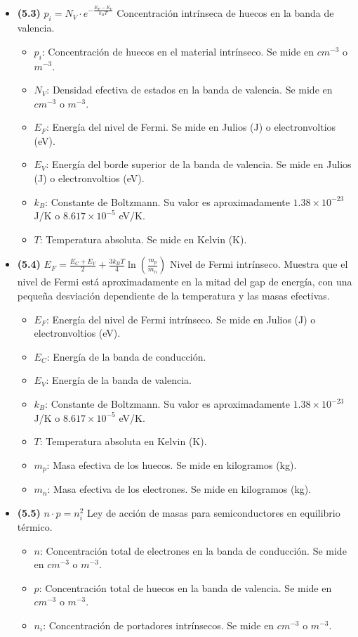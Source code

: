\documentclass{article}
\begin{document}
\begin{itemize}
				\item \textbf{(5.3)} $\boxed{p_i = N_V \cdot e^{-\frac{E_F - E_V}{k_B T}}}$ Concentración intrínseca de huecos en la banda de valencia.
					\begin{itemize}
						\item $p_i$: Concentración de huecos en el material intrínseco. Se mide en $cm^{-3}$ o $m^{-3}$.
						\item $N_V$: Densidad efectiva de estados en la banda de valencia. Se mide en $cm^{-3}$ o $m^{-3}$.
						\item $E_F$: Energía del nivel de Fermi. Se mide en Julios (J) o electronvoltios (eV).
						\item $E_V$: Energía del borde superior de la banda de valencia. Se mide en Julios (J) o electronvoltios (eV).
						\item $k_B$: Constante de Boltzmann. Su valor es aproximadamente $1.38 \times 10^{-23}$ J/K o $8.617 \times 10^{-5}$ eV/K.
						\item $T$: Temperatura absoluta. Se mide en Kelvin (K).
					\end{itemize}

				\item \textbf{(5.4)} $\boxed{E_F = \frac{E_C + E_V}{2} + \frac{3k_B T}{4} \ln \left( \frac{m_p}{m_n} \right)}$ Nivel de Fermi intrínseco. Muestra que el nivel de Fermi está aproximadamente en la mitad del gap de energía, con una pequeña desviación dependiente de la temperatura y las masas efectivas.
					\begin{itemize}
						\item $E_F$: Energía del nivel de Fermi intrínseco. Se mide en Julios (J) o electronvoltios (eV).
						\item $E_C$: Energía de la banda de conducción.
						\item $E_V$: Energía de la banda de valencia.
						\item $k_B$: Constante de Boltzmann. Su valor es aproximadamente $1.38 \times 10^{-23}$ J/K o $8.617 \times 10^{-5}$ eV/K.
						\item $T$: Temperatura absoluta en Kelvin (K).
						\item $m_p$: Masa efectiva de los huecos. Se mide en kilogramos (kg).
						\item $m_n$: Masa efectiva de los electrones. Se mide en kilogramos (kg).
					\end{itemize}

				\item \textbf{(5.5)} $\boxed{n \cdot p = n_i^2}$ Ley de acción de masas para semiconductores en equilibrio térmico.
					\begin{itemize}
						\item $n$: Concentración total de electrones en la banda de conducción. Se mide en $cm^{-3}$ o $m^{-3}$.
						\item $p$: Concentración total de huecos en la banda de valencia. Se mide en $cm^{-3}$ o $m^{-3}$.
						\item $n_i$: Concentración de portadores intrínsecos. Se mide en $cm^{-3}$ o $m^{-3}$.
					\end{itemize}


\end{itemize}
\end{document}
